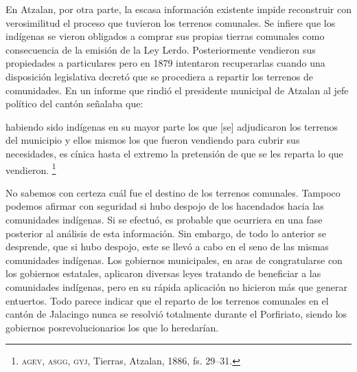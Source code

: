 \documentclass[14pt,twoside,final]{extbook} %
\let\oldfootnote\footnote
\renewcommand\footnote[1]{%
\oldfootnote{\hspace{1mm}#1}}
\begin{document}
En Atzalan, por otra parte, la escasa información existente impide reconstruir con verosimilitud el proceso que tuvieron los terrenos comunales. Se infiere que los indígenas se vieron obligados a comprar sus propias tierras comunales como consecuencia de la emisión de la Ley Lerdo. Posteriormente vendieron sus propiedades a particulares pero en 1879 intentaron recuperarlas cuando una disposición legislativa decretó que se procediera a repartir los terrenos de comunidades. En un informe que rindió el presidente municipal de Atzalan al jefe político del cantón señalaba que:
\begin{quoting}
habiendo sido indígenas en su mayor parte los que [se] adjudicaron los terrenos del municipio y ellos mismos los que fueron vendiendo para cubrir sus necesidades, es cínica hasta el extremo la pretensión de que se les reparta lo que vendieron.\footnote{\textsc{agev, asgg, gyj}, Tierras, Atzalan, 1886, fs. 29--31.}
\end{quoting}
No sabemos con certeza cuál fue el destino de los terrenos comunales. Tampoco podemos afirmar con seguridad si hubo despojo de los hacendados hacia las comunidades indígenas. Si se efectuó, es probable que ocurriera en una fase posterior al análisis de esta información. Sin embargo, de todo lo anterior se desprende, que si hubo despojo, este se llevó a cabo en el seno de las mismas comunidades indígenas. Los gobiernos municipales, en aras de congratularse con los gobiernos estatales, aplicaron
diversas leyes tratando de beneficiar a las comunidades indígenas, pero en su rápida aplicación no hicieron más que generar entuertos. Todo parece indicar que el reparto de los terrenos comunales en el cantón de Jalacingo nunca se resolvió totalmente durante el Porfiriato, siendo los gobiernos posrevolucionarios los que lo heredarían.
\end{document}
